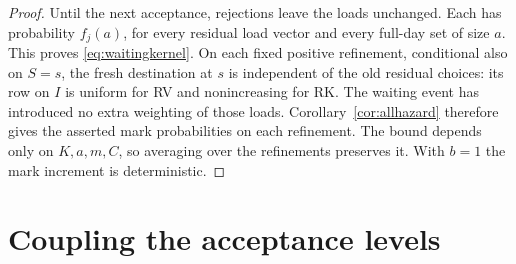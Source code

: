 \documentclass[11pt]{article}
\begin{document}
\begin{proof}
Until the next acceptance, rejections leave the loads unchanged.
Each has probability $f_j(a)$, for every residual load vector and
every full-day set of size $a$. This proves
\eqref{eq:waitingkernel}. On each fixed positive refinement, conditional also on $S=s$, the fresh
destination at $s$ is independent of the old residual choices: its row on $I$
is uniform for RV and nonincreasing for RK. The waiting event has
introduced no extra weighting of those loads. Corollary~\ref{cor:allhazard}
therefore gives the asserted mark probabilities on each refinement.
The bound depends only on $K,a,m,C$, so averaging over the refinements
preserves it. With $b=1$ the mark increment is deterministic.
\end{proof}

\section{Coupling the acceptance levels}\label{sec:coupling}
\end{document}
